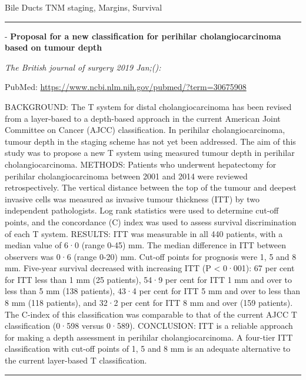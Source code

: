 \documentclass[]{article}
\begin{document}
Bile Ducts TNM staging, Margins, Survival

\begin{center}\rule{0.5\linewidth}{\linethickness}\end{center}

 - \textbf{Proposal for a new classification for perihilar
cholangiocarcinoma based on tumour depth}

\emph{The British journal of surgery 2019 Jan;():}

PubMed: \url{https://www.ncbi.nlm.nih.gov/pubmed/?term=30675908}

BACKGROUND: The T system for distal cholangiocarcinoma has been revised
from a layer-based to a depth-based approach in the current American
Joint Committee on Cancer (AJCC) classification. In perihilar
cholangiocarcinoma, tumour depth in the staging scheme has not yet been
addressed. The aim of this study was to propose a new T system using
measured tumour depth in perihilar cholangiocarcinoma. METHODS: Patients
who underwent hepatectomy for perihilar cholangiocarcinoma between 2001
and 2014 were reviewed retrospectively. The vertical distance between
the top of the tumour and deepest invasive cells was measured as
invasive tumour thickness (ITT) by two independent pathologists. Log
rank statistics were used to determine cut-off points, and the
concordance (C) index was used to assess survival discrimination of each
T system. RESULTS: ITT was measurable in all 440 patients, with a median
value of 6·0 (range 0-45) mm. The median difference in ITT between
observers was 0·6 (range 0-20) mm. Cut-off points for prognosis were 1,
5 and 8 mm. Five-year survival decreased with increasing ITT (P
\textless{} 0·001): 67 per cent for ITT less than 1 mm (25 patients),
54·9 per cent for ITT 1 mm and over to less than 5 mm (138 patients),
43·4 per cent for ITT 5 mm and over to less than 8 mm (118 patients),
and 32·2 per cent for ITT 8 mm and over (159 patients). The C-index of
this classification was comparable to that of the current AJCC T
classification (0·598 versus 0·589). CONCLUSION: ITT is a reliable
approach for making a depth assessment in perihilar cholangiocarcinoma.
A four-tier ITT classification with cut-off points of 1, 5 and 8 mm is
an adequate alternative to the current layer-based T classification.

{}

{}

\begin{center}\rule{0.5\linewidth}{\linethickness}\end{center}
\end{document}
